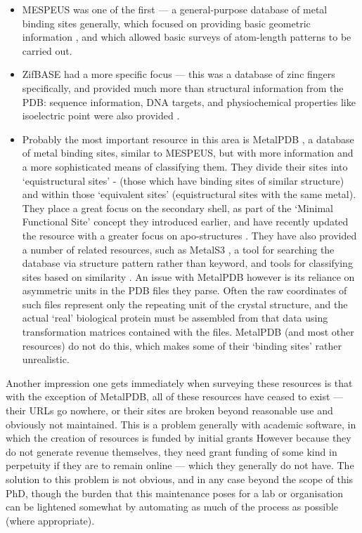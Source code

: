 \begin{itemize}

\item MESPEUS was one of the first --- a general-purpose database of metal binding sites generally, which focused on providing basic geometric information \cite{hsin2008mespeus}, and which allowed basic surveys of atom-length patterns to be carried out.

\item ZifBASE had a more specific focus --- this was a database of zinc fingers specifically, and provided much more than structural information from the PDB: sequence information, DNA targets, and physiochemical properties like isoelectric point were also provided \cite{jayakanthan2009zifbase}.

\item Probably the most important resource in this area is MetalPDB \cite{andreini2012metalpdb}, a database of metal binding sites, similar to MESPEUS, but with more information and a more sophisticated means of classifying them. They divide their sites into `equistructural sites' - (those which have binding sites of similar structure) and within those `equivalent sites'  (equistructural sites with the same metal). They place a great focus on the secondary shell, as part of the `Minimal Functional Site' concept they introduced earlier, and have recently updated the resource with a greater focus on apo-structures \cite{putignano2017metalpdb}. They have also provided a number of related resources, such as MetalS3 \cite{valasatava2014metals}, a tool for searching the database via structure pattern rather than keyword, and tools for classifying sites based on similarity \cite{sobolev2013web}. An issue with MetalPDB however is its reliance on asymmetric units in the PDB files they parse. Often the raw coordinates of such files represent only the repeating unit of the crystal structure, and the actual `real' biological protein must be assembled from that data using transformation matrices contained with the files. MetalPDB (and most other resources) do not do this, which makes some of their `binding sites' rather unrealistic.

\end{itemize}

Another impression one gets immediately when surveying these resources is that with the exception of MetalPDB, all of these resources have ceased to exist --- their URLs go nowhere, or their sites are broken beyond reasonable use and obviously not maintained. This is a problem generally with academic software, in which the creation of resources is funded by initial grants However because they do not generate revenue themselves, they need grant funding of some kind in perpetuity if they are to remain online --- which they generally do not have. The solution to this problem is not obvious, and in any case beyond the scope of this PhD, though the burden that this maintenance poses for a lab or organisation can be lightened somewhat by automating as much of the process as possible (where appropriate).

